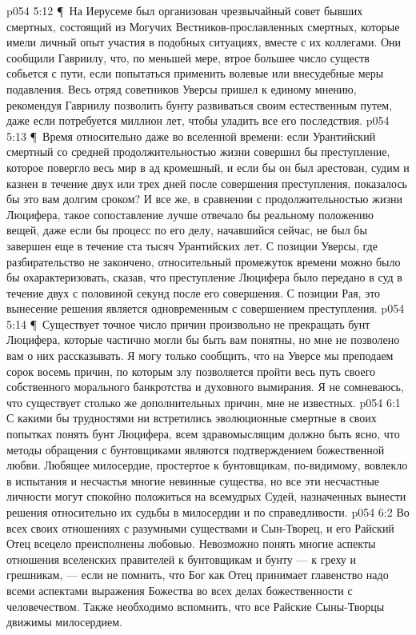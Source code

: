 \vs p054 5:12 \P\ \bibnobreakspace На Иерусеме был организован чрезвычайный совет бывших смертных, состоящий из Могучих Вестников\hyp{}прославленных смертных, которые имели личный опыт участия в подобных ситуациях, вместе с их коллегами. Они сообщили Гавриилу, что, по меньшей мере, втрое большее число существ собьется с пути, если попытаться применить волевые или внесудебные меры подавления. Весь отряд советников Уверсы пришел к единому мнению, рекомендуя Гавриилу позволить бунту развиваться своим естественным путем, даже если потребуется миллион лет, чтобы уладить все его последствия.
\vs p054 5:13 \P\ \bibnobreakspace Время относительно даже во вселенной времени: если Урантийский смертный со средней продолжительностью жизни совершил бы преступление, которое повергло весь мир в ад кромешный, и если бы он был арестован, судим и казнен в течение двух или трех дней после совершения преступления, показалось бы это вам долгим сроком? И все же, в сравнении с продолжительностью жизни Люцифера, такое сопоставление лучше отвечало бы реальному положению вещей, даже если бы процесс по его делу, начавшийся сейчас, не был бы завершен еще в течение ста тысяч Урантийских лет. С позиции Уверсы, где разбирательство не закончено, относительный промежуток времени можно было бы охарактеризовать, сказав, что преступление Люцифера было передано в суд в течение двух с половиной секунд после его совершения. С позиции Рая, это вынесение решения является одновременным с совершением преступления.
\vs p054 5:14 \P\ Существует точное число причин произвольно не прекращать бунт Люцифера, которые частично могли бы быть вам понятны, но мне не позволено вам о них рассказывать. Я могу только сообщить, что на Уверсе мы преподаем сорок восемь причин, по которым злу позволяется пройти весь путь своего собственного морального банкротства и духовного вымирания. Я не сомневаюсь, что существует столько же дополнительных причин, мне не известных.
\vs p054 6:1 С какими бы трудностями ни встретились эволюционные смертные в своих попытках понять бунт Люцифера, всем здравомыслящим должно быть ясно, что методы обращения с бунтовщиками являются подтверждением божественной любви. Любящее милосердие, простертое к бунтовщикам, по\hyp{}видимому, вовлекло в испытания и несчастья многие невинные существа, но все эти несчастные личности могут спокойно положиться на всемудрых Судей, назначенных вынести решения относительно их судьбы в милосердии и по справедливости.
\vs p054 6:2 Во всех своих отношениях с разумными существами и Сын\hyp{}Творец, и его Райский Отец всецело преисполнены любовью. Невозможно понять многие аспекты отношения вселенских правителей к бунтовщикам и бунту --- к греху и грешникам, --- если не помнить, что Бог как Отец принимает главенство надо всеми аспектами выражения Божества во всех делах божественности с человечеством. Также необходимо вспомнить, что все Райские Сыны\hyp{}Творцы движимы милосердием.
